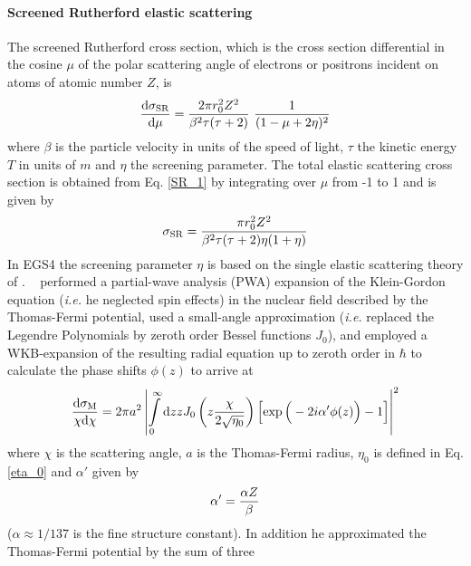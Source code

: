 \paragraph{Screened Rutherford elastic scattering} \hfill
{}

The screened Rutherford cross section, which is the cross
section differential in the cosine $\mu$ of the polar
scattering angle of electrons or positrons incident
on atoms of atomic number $Z$, is
\begin{equation}
\label{SR_1}
{{\rm d} \sigma_{\rm SR} \over {\rm d}\mu} = {2 \pi r_0^2 Z^2 \over
\beta^2 \tau (\tau + 2) }~{1 \over (1 - \mu + 2 \eta)^2}
\end{equation}
where $\beta$ is the particle velocity in units of the speed of
light, $\tau$ the kinetic energy $T$ in units of $m$
and $\eta$ the screening parameter. The total elastic scattering
cross section is obtained from Eq. \eqref{SR_1} by integrating
over $\mu$ from -1 to 1 and is given by
\begin{equation}
\label{SR_2}
\sigma_{\rm SR} = {\pi r_0^2 Z^2 \over \beta^2 \tau (\tau+2) \eta (1 + \eta)}
\end{equation}
In EGS4 the screening parameter $\eta$ is based on the single
elastic scattering theory of \Mol \cite{Mo47}. \Mol~
performed a partial-wave analysis (PWA) expansion
of the Klein-Gordon equation ({\em i.e.} he neglected spin effects)
in the nuclear field described by the Thomas-Fermi potential,
used a small-angle approximation ({\em i.e.} replaced the Legendre
Polynomials by zeroth order Bessel functions $J_0$),
and employed a WKB-expansion
of the resulting radial equation up to zeroth order in $\hbar$
to calculate the phase shifts $\phi(z)$ to arrive at
\begin{equation}
\label{el_mol}
{{\rm d} \sigma_{\rm M} \over \chi {\rm d} \chi} =
2 \pi a^2 \left| \int\limits_0^\infty {\rm d}z z J_0\left(z {\chi \over
2 \sqrt{\eta_0}} \right) \left[ \exp\Big( - 2 i \alpha'
\phi(z) \Big) - 1 \right]
\right|^2
\end{equation}
where $\chi$ is the scattering angle, $a$ is the Thomas-Fermi radius,
$\eta_0$ is defined in Eq. \eqref{eta_0} and $\alpha'$ given by
\begin{equation}
\label{alpha_prime}
\alpha' = {\alpha Z \over \beta}
\end{equation}
($\alpha \approx 1/137$ is the fine structure constant). In addition
he approximated the Thomas-Fermi potential by the sum of three
